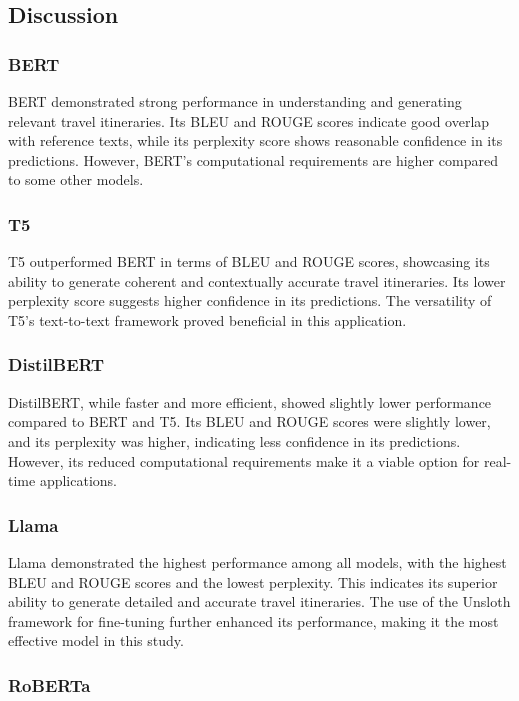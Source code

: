 \documentclass[conference]{IEEEtran}
\begin{document}
\subsection{Discussion}

\subsubsection{BERT}

BERT demonstrated strong performance in understanding and generating relevant travel itineraries. Its BLEU and ROUGE scores indicate good overlap with reference texts, while its perplexity score shows reasonable confidence in its predictions. However, BERT's computational requirements are higher compared to some other models.

\subsubsection{T5}

T5 outperformed BERT in terms of BLEU and ROUGE scores, showcasing its ability to generate coherent and contextually accurate travel itineraries. Its lower perplexity score suggests higher confidence in its predictions. The versatility of T5's text-to-text framework proved beneficial in this application.

\subsubsection{DistilBERT}

DistilBERT, while faster and more efficient, showed slightly lower performance compared to BERT and T5. Its BLEU and ROUGE scores were slightly lower, and its perplexity was higher, indicating less confidence in its predictions. However, its reduced computational requirements make it a viable option for real-time applications.

\subsubsection{Llama}

Llama demonstrated the highest performance among all models, with the highest BLEU and ROUGE scores and the lowest perplexity. This indicates its superior ability to generate detailed and accurate travel itineraries. The use of the Unsloth framework for fine-tuning further enhanced its performance, making it the most effective model in this study.

\subsubsection{RoBERTa}
\end{document}
